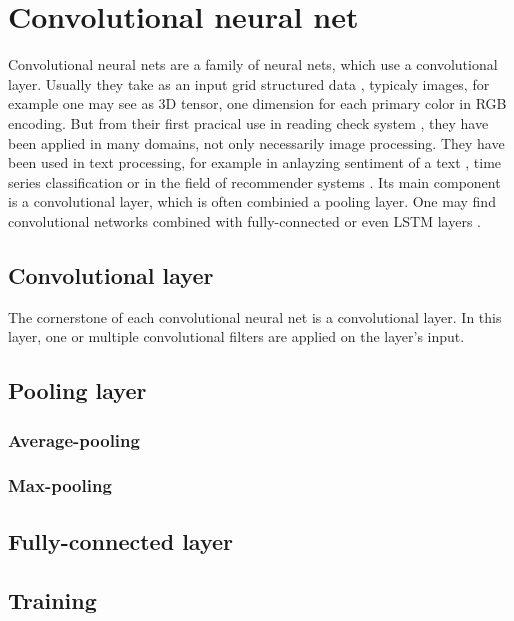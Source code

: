 \documentclass[twoside]{ctuthesis}
\theoremstyle{plain}
\theoremstyle{definition}
\theoremstyle{note}
\begin{document}
\chapter{Convolutional neural net}
Convolutional neural nets are a family of neural nets, which use a convolutional layer.
Usually they take as an input grid structured data \cite{DL_BOOK}, typicaly images, for example
 one may see as 3D tensor, one dimension for each primary color in RGB encoding. But from their
 first pracical use in reading check system \cite{CHECKS}, they have been applied in many 
 domains, not only necessarily image processing. They have been used in text processing, for
 example in anlayzing sentiment of a text \cite{SENTIMENT_CNN}, time series classification 
\cite{TS_CNN} or in the field of recommender systems \cite{REC_CNN}. Its main component is a
convolutional layer, which is often combinied a pooling layer. One may find convolutional 
networks combined with fully-connected or even LSTM layers \cite{LSTM_CNN}.


\section{Convolutional layer}
The cornerstone of each convolutional neural net is a convolutional layer. In this layer, 
one or multiple convolutional filters are applied on the layer's input. 

\section{Pooling layer}

\subsection{Average-pooling}


\subsection{Max-pooling}


\section{Fully-connected layer}


\section{Training}

\end{document}
